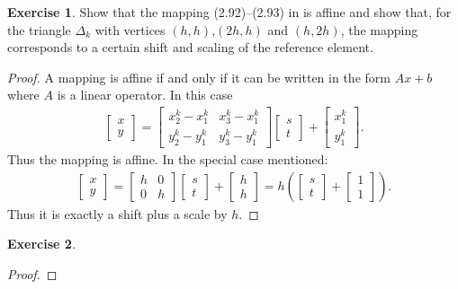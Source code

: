 \documentclass{amsart}
\theoremstyle{plain}
\theoremstyle{definition}
\newtheorem{exer}{Exercise}[section]
\begin{document}
\begin{exer}
    Show that the mapping (2.92)–(2.93) in \cite{lord2014introduction} is affine and show that, for the triangle $\Delta_k$ with vertices $(h,h)$,$(2h,h)$ and $(h,2h)$, the mapping corresponds to a certain shift and scaling of the reference element.
\end{exer}
\begin{proof}
    A mapping is affine if and only if it can be written in the form $Ax+b$ where $A$ is a linear operator. In this case 
    \begin{gather}
        \begin{bmatrix}
            x\\y
        \end{bmatrix}=\begin{bmatrix}
            x_2^k-x_1^k & x_3^k-x_1^k\\
            y_2^k-y_1^k & y_3^k-y_1^k
        \end{bmatrix}\begin{bmatrix}
            s\\t
        \end{bmatrix}+\begin{bmatrix}
            x_1^k\\y_1^k
        \end{bmatrix}.
    \end{gather}
    Thus the mapping is affine. In the special case mentioned:
    \begin{gather}
        \begin{bmatrix}
            x\\y
        \end{bmatrix}=\begin{bmatrix}
            h & 0\\
            0 & h
        \end{bmatrix}\begin{bmatrix}
            s\\t
        \end{bmatrix}+\begin{bmatrix}
            h\\h
        \end{bmatrix} = h\left(\begin{bmatrix}
            s\\t
        \end{bmatrix}+\begin{bmatrix}
            1\\1
        \end{bmatrix}\right).
    \end{gather}
    Thus it is exactly a shift plus a scale by $h$.
\end{proof}

\begin{exer}
    
\end{exer}
\begin{proof}
    
\end{proof}

\printbibliography
\end{document}
